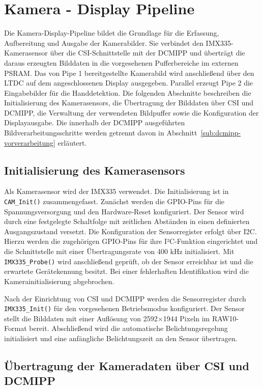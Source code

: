 \section{Kamera - Display Pipeline}\label{sec:kamera-display-pipeline}
Die Kamera-Display-Pipeline bildet die Grundlage für die Erfassung, Aufbereitung und Ausgabe der Kamerabilder. Sie verbindet den IMX335-Kamerasensor über die CSI-Schnittstelle mit der DCMIPP und überträgt die daraus erzeugten Bilddaten in die vorgesehenen Pufferbereiche im externen PSRAM. Das von Pipe 1 bereitgestellte Kamerabild wird anschließend über den LTDC auf dem angeschlossenen Display ausgegeben. Parallel erzeugt Pipe 2 die Eingabebilder für die Handdetektion. Die folgenden Abschnitte beschreiben die Initialisierung des Kamerasensors, die Übertragung der Bilddaten über CSI und DCMIPP, die Verwaltung der verwendeten Bildpuffer sowie die Konfiguration der Displayausgabe. Die innerhalb der DCMIPP ausgeführten Bildverarbeitungsschritte werden getrennt davon in Abschnitt~\ref{sub:dcmipp-vorverarbeitung} erläutert.

\subsection{Initialisierung des Kamerasensors}\label{sub:kamera-init}

Als Kamerasensor wird der IMX335 verwendet. Die Initialisierung ist in \texttt{CAM\_Init()} zusammengefasst. Zunächst werden die GPIO-Pins für die Spannungsversorgung und den Hardware-Reset konfiguriert. Der Sensor wird durch eine festgelegte Schaltfolge mit zeitlichen Abständen in einen definierten Ausgangszustand versetzt. Die Konfiguration der Sensorregister erfolgt über I2C. Hierzu werden die zugehörigen GPIO-Pins für ihre I²C-Funktion eingerichtet und die Schnittstelle mit einer Übertragungsrate von 400 kHz initialisiert. Mit \texttt{IMX335\_Probe()} wird anschließend geprüft, ob der Sensor erreichbar ist und die erwartete Gerätekennung besitzt. Bei einer fehlerhaften Identifikation wird die Kamerainitialisierung abgebrochen.

Nach der Einrichtung von CSI und DCMIPP werden die Sensorregister durch \texttt{IMX335\_Init()} für den vorgesehenen Betriebsmodus konfiguriert. Der Sensor stellt die Bilddaten mit einer Auflösung von 2592×1944 Pixeln im RAW10-Format bereit. Abschließend wird die automatische Belichtungsregelung initialisiert und eine anfängliche Belichtungszeit an den Sensor übertragen.

\subsection{Übertragung der Kameradaten über CSI und DCMIPP}\label{sub:csi-dcmipp}

